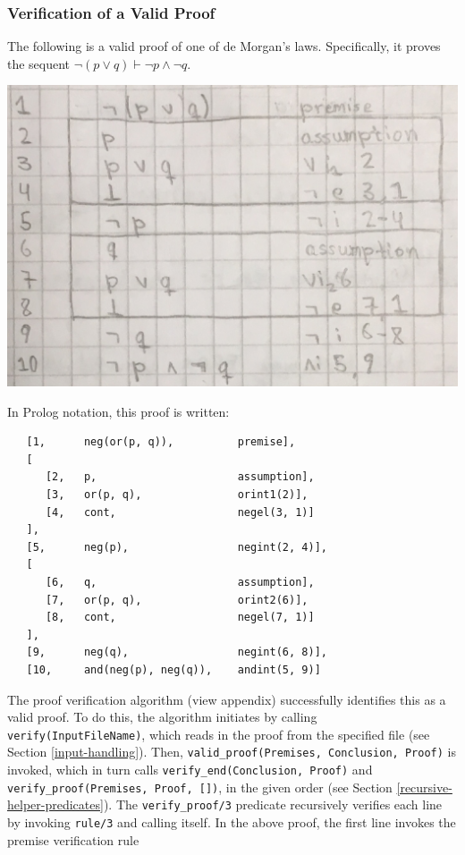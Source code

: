 \documentclass[a4paper, 11pt]{article}
\begin{document}
   \subsubsection{Verification of a Valid Proof}

   The following is a valid proof of one of de Morgan's laws.
   Specifically, it proves the sequent 
   $\neg(p \vee q) \vdash \neg p \wedge \neg q$.
   \bigbreak

   \includegraphics[scale=0.25]{de-morgan-valid}
   
   In Prolog notation, this proof is written:

\begin{verbatim}
   [1,      neg(or(p, q)),          premise],
   [
      [2,   p,                      assumption],
      [3,   or(p, q),               orint1(2)],
      [4,   cont,                   negel(3, 1)]
   ],
   [5,      neg(p),                 negint(2, 4)],
   [
      [6,   q,                      assumption],
      [7,   or(p, q),               orint2(6)],
      [8,   cont,                   negel(7, 1)]
   ],
   [9,      neg(q),                 negint(6, 8)],
   [10,     and(neg(p), neg(q)),    andint(5, 9)]
\end{verbatim}

   The proof verification algorithm (view appendix)
   successfully identifies this as a valid proof. To do this,
   the algorithm initiates by calling \\
   \texttt{verify(InputFileName)}, which reads in the proof 
   from the specified file (see Section \ref{input-handling}).
   Then, \texttt{valid\_proof(Premises, Conclusion, Proof)} 
   is invoked, which in turn calls
   \texttt{verify\_end(Conclusion, Proof)} and \\
   \texttt{verify\_proof(Premises, Proof, [])}, in the given 
   order (see Section \ref{recursive-helper-predicates}).
   The \texttt{verify\_proof/3} predicate recursively
   verifies each line by invoking \texttt{rule/3} and
   calling itself. In the above proof, the first
   line invokes the premise verification rule
\end{document}
